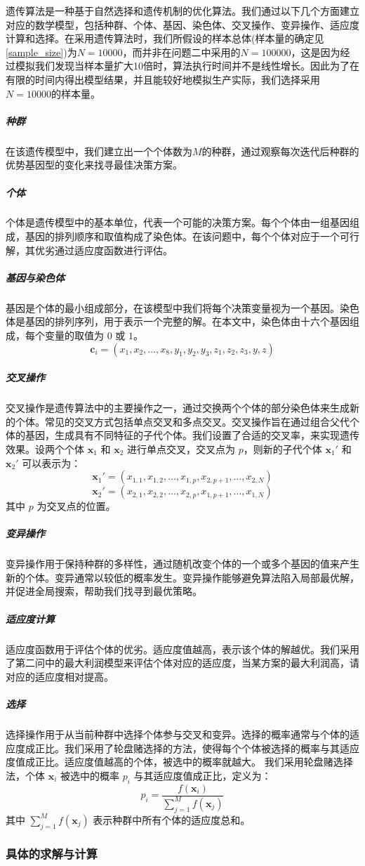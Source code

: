 \documentclass[utf8]{ctexart} %
\begin{document}
		遗传算法是一种基于自然选择和遗传机制的优化算法。我们通过以下几个方面建立对应的数学模型，包括种群、个体、基因、染色体、交叉操作、变异操作、适应度计算和选择。在采用遗传算法时，我们所假设的样本总体(样本量的确定见\ref{sample_size})为$N=10000$，而并非在问题二中采用的$N=100000$，这是因为经过模拟我们发现当样本量扩大10倍时，算法执行时间并不是线性增长。因此为了在有限的时间内得出模型结果，并且能较好地模拟生产实际，我们选择采用$N=10000$的样本量。
		\subparagraph{种群}
		在该遗传模型中，我们建立出一个个体数为$M$的种群，通过观察每次迭代后种群的优势基因型的变化来找寻最佳决策方案。
		\subparagraph{个体}
		个体是遗传模型中的基本单位，代表一个可能的决策方案。每个个体由一组基因组成，基因的排列顺序和取值构成了染色体。在该问题中，每个个体对应于一个可行解，其优劣通过适应度函数进行评估。
		\subparagraph{基因与染色体}
		基因是个体的最小组成部分，在该模型中我们将每个决策变量视为一个基因。染色体是基因的排列序列，用于表示一个完整的解。在本文中，染色体由十六个基因组成，每个变量的取值为 $0$ 或 $1$。
		\[
		\mathbf{c}_i = (x_1, x_2, \dots, x_8, y_1, y_2, y_3, z_1, z_2, z_3, y, z)
		\]
		\subparagraph{交叉操作}
		交叉操作是遗传算法中的主要操作之一，通过交换两个个体的部分染色体来生成新的个体。常见的交叉方式包括单点交叉和多点交叉。交叉操作旨在通过组合父代个体的基因，生成具有不同特征的子代个体。我们设置了合适的交叉率，来实现遗传效果。设两个个体 $\mathbf{x}_1$ 和 $\mathbf{x}_2$ 进行单点交叉，交叉点为 $p$，则新的子代个体 $\mathbf{x}_1'$ 和 $\mathbf{x}_2'$ 可以表示为：
		\[
		\mathbf{x}_1' = (x_{1,1}, x_{1,2}, \dots, x_{1,p}, x_{2,p+1}, \dots, x_{2,N})
		\]
		\[
		\mathbf{x}_2' = (x_{2,1}, x_{2,2}, \dots, x_{2,p}, x_{1,p+1}, \dots, x_{1,N})
		\]
		其中 $p$ 为交叉点的位置。
		\subparagraph{变异操作}
		变异操作用于保持种群的多样性，通过随机改变个体的一个或多个基因的值来产生新的个体。变异通常以较低的概率发生。变异操作能够避免算法陷入局部最优解，并促进全局搜索，帮助我们找寻到最优策略。
		\subparagraph{适应度计算}
		适应度函数用于评估个体的优劣。适应度值越高，表示该个体的解越优。我们采用了第二问中的最大利润模型来评估个体对应的适应度，当某方案的最大利润高，请对应的适应度相对提高。
		\subparagraph{选择}
		选择操作用于从当前种群中选择个体参与交叉和变异。选择的概率通常与个体的适应度成正比。我们采用了轮盘赌选择的方法，使得每个个体被选择的概率与其适应度值成正比。适应度值越高的个体，被选中的概率就越大。
		我们采用轮盘赌选择法，个体 $\mathbf{x}_i$ 被选中的概率 $p_i$ 与其适应度值成正比，定义为：
		\[
		p_i = \frac{f(\mathbf{x}_i)}{\sum_{j=1}^M f(\mathbf{x}_j)}
		\]
		其中 $\sum_{j=1}^M f(\mathbf{x}_j)$ 表示种群中所有个体的适应度总和。
		\subsubsection{具体的求解与计算}
		
\end{document}
